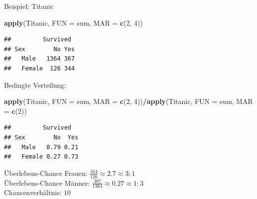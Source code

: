 \documentclass[
  10pt,
  ignorenonframetext,
]{beamer}
\newenvironment{Shaded}{\begin{snugshade}}{\end{snugshade}}
\newcommand{\AttributeTok}[1]{\textcolor[rgb]{0.13,0.29,0.53}{#1}}
\newcommand{\DecValTok}[1]{\textcolor[rgb]{0.00,0.00,0.81}{#1}}
\newcommand{\FunctionTok}[1]{\textcolor[rgb]{0.13,0.29,0.53}{\textbf{#1}}}
\newcommand{\NormalTok}[1]{#1}
\newcommand{\SpecialCharTok}[1]{\textcolor[rgb]{0.81,0.36,0.00}{\textbf{#1}}}
\begin{document}
\begin{frame}[fragile]{Beispiel: Titanic}
\label{beispiel-titanic-2}
\scriptsize

\begin{Shaded}
\begin{Highlighting}[]
\FunctionTok{apply}\NormalTok{(Titanic, }\AttributeTok{FUN =}\NormalTok{ sum, }\AttributeTok{MAR =} \FunctionTok{c}\NormalTok{(}\DecValTok{2}\NormalTok{, }\DecValTok{4}\NormalTok{))}
\end{Highlighting}
\end{Shaded}

\begin{verbatim}
##         Survived
## Sex        No Yes
##   Male   1364 367
##   Female  126 344
\end{verbatim}

\normalsize

Bedingte Verteilung: \scriptsize

\begin{Shaded}
\begin{Highlighting}[]
\FunctionTok{apply}\NormalTok{(Titanic, }\AttributeTok{FUN =}\NormalTok{ sum, }\AttributeTok{MAR =} \FunctionTok{c}\NormalTok{(}\DecValTok{2}\NormalTok{, }\DecValTok{4}\NormalTok{))}\SpecialCharTok{/}\FunctionTok{apply}\NormalTok{(Titanic, }\AttributeTok{FUN =}\NormalTok{ sum, }\AttributeTok{MAR =} \FunctionTok{c}\NormalTok{(}\DecValTok{2}\NormalTok{))}
\end{Highlighting}
\end{Shaded}

\begin{verbatim}
##         Survived
## Sex        No  Yes
##   Male   0.79 0.21
##   Female 0.27 0.73
\end{verbatim}

\normalsize

Überlebens-Chance Frauen: \(\frac{344}{126} \approx 2.7 \approx 3:1\)\\
Überlebens-Chance Männer:
\(\frac{367}{1364} \approx 0.27 \approx 1:3\)\\
Chancenverhältnis: \(10\)

\end{frame}
\end{document}
